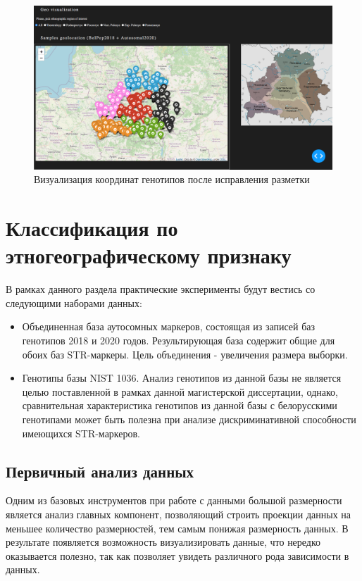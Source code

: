 \begin{figure}[h]
\begin{center}
\includegraphics[width=14cm]{images/geomap_v2.png}
\end{center}
  \caption{Визуализация координат генотипов после исправления разметки}
  \label{image:geomapv2}
\end{figure}

\section{Классификация по этногеографическому признаку}

В рамках данного раздела практические эксперименты будут вестись со следующими наборами данных:
\begin{itemize}
\item Объединенная база аутосомных маркеров, состоящая из записей баз генотипов 2018 и 2020 годов.
Результирующая база содержит общие для обоих баз STR-маркеры. Цель объединения - увеличения размера
выборки.

\item Генотипы базы NIST 1036. Анализ генотипов из данной базы не является целью
поставленной в рамках данной магистерской диссертации, однако, сравнительная характеристика
генотипов из данной базы с белорусскими генотипами может быть полезна при анализе дискриминативной
способности имеющихся STR-маркеров.
\end{itemize}

\subsection{Первичный анализ данных}
Одним из базовых инструментов при работе с данными большой размерности является
анализ главных компонент, позволяющий строить проекции данных на меньшее количество размерностей,
тем самым понижая размерность данных. В результате появляется возможность визуализировать данные,
что нередко оказывается полезно, так как позволяет увидеть различного рода зависимости в данных.

